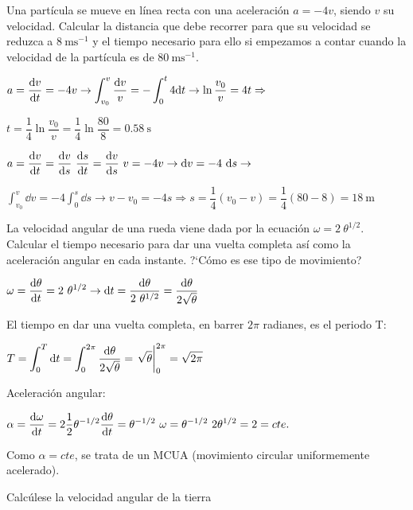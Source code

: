 \begin{prob}
Una partícula se mueve en línea recta con una aceleración $a=-4v$, siendo $v$ su velocidad. Calcular la distancia que debe recorrer para que su velocidad se reduzca a $8\ \mathrm{ms}^{-1}$ y el tiempo necesario para ello si empezamos a contar cuando la velocidad de la partícula es de $80\ \mathrm{ms}^{-1}$.	
\end{prob}

$\displaystyle a=\dv{v}{t}=-4v \to \int_{v_0}^v \dfrac{\dd v}{v}=-\int_0^t 4 \dd t \to \ln \dfrac {v_0}{v}=4t \Rightarrow $ 

$\displaystyle t=\dfrac 1 4 \ln \dfrac {v_0}{v}=\dfrac 1 4 \ln \dfrac {80}{8}=0.58\ \mathrm{s}$

$\displaystyle a=\dv{v}{t}=\dv{v}{s}\ \dv{s}{t}=\dv{v}{s} \ v=-4v \to \dd v=-4 \ \dd s \to $

$\displaystyle \int_{v_0}^v
 \dd v=-4\int_0^s \dd s \to v-v_0=-4s \Rightarrow s=\dfrac 1 4 (v_0-v)=\dfrac 1 4 (80-8)=18\ \mathrm{m}$

\vspace{10mm} %
\begin{prob}
La velocidad angular de una rueda viene dada por la ecuación $\omega=2\ \theta^{1/2}$. Calcular el tiempo necesario para dar una vuelta completa así como la aceleración angular en cada instante. ?`Cómo es ese tipo de movimiento?	
\end{prob}
$\omega=\displaystyle \dv{\theta}{t}=2\ \theta^{1/2} \to \dd t=\dfrac{\dd \theta}{2\ \theta^{1/2}}=\dfrac{\dd \theta}{2\sqrt{\theta}}$

El tiempo en dar una vuelta completa, en barrer $2 \pi$ radianes, es el periodo T:

$\displaystyle T=\int_0^T \dd t=\int_0^{2 \pi} \dfrac{\dd \theta}{2\sqrt{\theta}}=\eval{\sqrt{\theta}}_0^{2 \pi}=\sqrt{2 \pi}$

Aceleración angular:

$\displaystyle \alpha= \dv{\omega}{t}=2 \frac 1 2 \theta^{-1/2} \dv{\theta}{t}=\theta^{-1/2} \ \omega =\theta^{-1/2}\ 2 \theta^{1/2}=2=cte.$ 

Como $\alpha=cte$, se trata de un MCUA (movimiento circular uniformemente acelerado).

\vspace{30mm} %

\begin{prob}
Calcúlese la velocidad angular de la tierra	
\end{prob}

